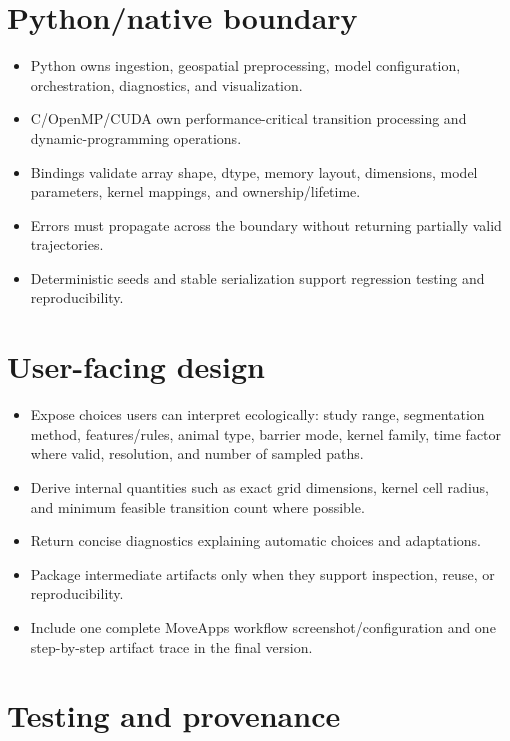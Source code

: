 \section{Python/native boundary}

\begin{itemize}
  \item Python owns ingestion, geospatial preprocessing, model configuration, orchestration, diagnostics, and visualization.
  \item C/OpenMP/CUDA own performance-critical transition processing and dynamic-programming operations.
  \item Bindings validate array shape, dtype, memory layout, dimensions, model parameters, kernel mappings, and ownership/lifetime.
  \item Errors must propagate across the boundary without returning partially valid trajectories.
  \item Deterministic seeds and stable serialization support regression testing and reproducibility.
\end{itemize}

\section{User-facing design}

\begin{itemize}
  \item Expose choices users can interpret ecologically: study range, segmentation method, features/rules, animal type, barrier mode, kernel family, time factor where valid, resolution, and number of sampled paths.
  \item Derive internal quantities such as exact grid dimensions, kernel cell radius, and minimum feasible transition count where possible.
  \item Return concise diagnostics explaining automatic choices and adaptations.
  \item Package intermediate artifacts only when they support inspection, reuse, or reproducibility.
  \item Include one complete MoveApps workflow screenshot/configuration and one step-by-step artifact trace in the final version.
\end{itemize}

\section{Testing and provenance}

